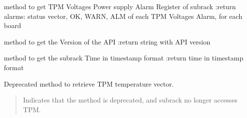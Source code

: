 \documentclass[letterpaper,10pt,english]{sphinxmanual}
\begin{document}
\begin{fulllineitems}
\begin{fulllineitems}
\label{\detokenize{apidocs:subrack_management_board.SubrackMngBoard.GetVoltageAlarm}}
\pysigstartsignatures
{}
\pysigstopsignatures
\sphinxAtStartPar
method to get TPM Voltages Power supply Alarm Register of subrack
:return alarms: status vector, OK, WARN, ALM of each TPM Voltages Alarm, for each board

\end{fulllineitems}


\begin{fulllineitems}
\label{\detokenize{apidocs:subrack_management_board.SubrackMngBoard.Get_API_version}}
\pysigstartsignatures
{}
\pysigstopsignatures
\sphinxAtStartPar
method to get the Version of the API
:return string with API version

\end{fulllineitems}


\begin{fulllineitems}
\label{\detokenize{apidocs:subrack_management_board.SubrackMngBoard.Get_Subrack_TimeTS}}
\pysigstartsignatures
{}
\pysigstopsignatures
\sphinxAtStartPar
method to get the subrack Time in timestamp format
:return time in timestamp format

\end{fulllineitems}


\begin{fulllineitems}
\label{\detokenize{apidocs:subrack_management_board.SubrackMngBoard.Get_TPM_temperature_vector}}
\pysigstartsignatures
{}
\pysigstopsignatures
\sphinxAtStartPar
Deprecated method to retrieve TPM temperature vector.
\begin{quote}\begin{description}
\sphinxAtStartPar
{\hyperref[\detokenize{apidocs:subrack_management_board.SubrackExecFault}]{}} \textendash{} Indicates that the method is deprecated, and
subrack no longer accesses TPM.


\end{description}
\end{quote}
\end{fulllineitems}
\end{fulllineitems}
\end{document}
